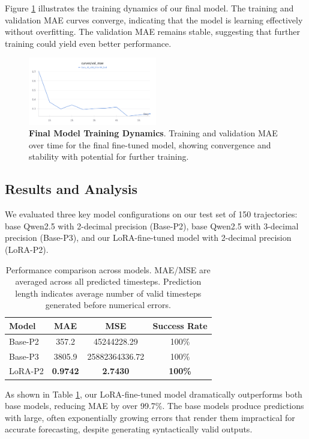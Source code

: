 \documentclass{article}
\begin{document}
Figure \ref{fig:final_model} illustrates the training dynamics of our final model. The training and validation MAE curves converge, indicating that the model is learning effectively without overfitting. The validation MAE remains stable, suggesting that further training could yield even better performance.
\begin{figure} [H]
    \centering
    \includegraphics[width=0.5\textwidth]{finetuned_training}
    \caption{\textbf{Final Model Training Dynamics}. Training and validation MAE over time for the final fine-tuned model, showing convergence and stability with potential for further training.}
    \label{fig:final_model}
\end{figure}
\subsection*{Results and Analysis}
We evaluated three key model configurations on our test set of 150 trajectories: base Qwen2.5 with 2-decimal precision (Base-P2), base Qwen2.5 with 3-decimal precision (Base-P3), and our LoRA-fine-tuned model with 2-decimal precision (LoRA-P2).


\begin{table}[H]
\centering
\begin{tabular}{lccc}
\hline
\textbf{Model} & \textbf{MAE} & \textbf{MSE} & \textbf{Success Rate}  \\
\hline
Base-P2 & 357.2 & 45244228.29 & 100\%  \\
Base-P3 & 3805.9 & 25882364336.72 & 100\% \\
LoRA-P2 & \textbf{0.9742} & \textbf{2.7430} & \textbf{100\%} \\
\hline
\end{tabular}
\caption{Performance comparison across models. MAE/MSE are averaged across all predicted timesteps. Prediction length indicates average number of valid timesteps generated before numerical errors.}
\label{tab:model_comparison}
\end{table}

As shown in Table \ref{tab:model_comparison}, our LoRA-fine-tuned model dramatically outperforms both base models, reducing MAE by over 99.7\%. The base models produce predictions with large, often exponentially growing errors that render them impractical for accurate forecasting, despite generating syntactically valid outputs.
\end{document}

